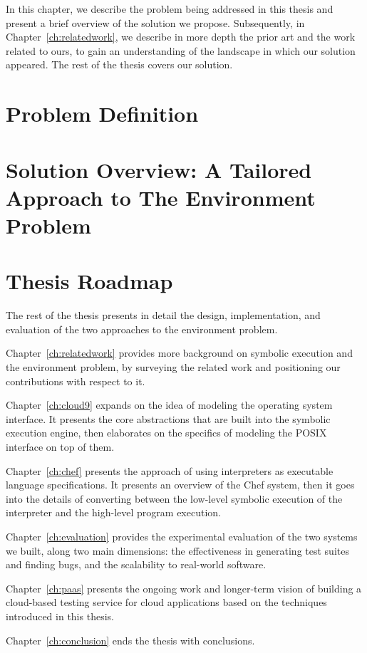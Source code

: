 In this chapter, we describe the problem being addressed in this thesis and present a brief overview of the solution we propose.
%
Subsequently, in Chapter~\ref{ch:relatedwork}, we describe in more depth the prior art and the work related to ours, to gain an understanding of the landscape in which our solution appeared.
%
The rest of the thesis covers our solution.

\section{Problem Definition}


\section{Solution Overview: A Tailored Approach to The Environment Problem}



\section{Thesis Roadmap}

The rest of the thesis presents in detail the design, implementation, and evaluation of the two approaches to the environment problem.

Chapter~\ref{ch:relatedwork} provides more background on symbolic execution and the environment problem, by surveying the related work and positioning our contributions with respect to it.

Chapter~\ref{ch:cloud9} expands on the idea of modeling the operating system interface.  It presents the core abstractions that are built into the symbolic execution engine, then elaborates on the specifics of modeling the POSIX interface on top of them.

Chapter~\ref{ch:chef} presents the approach of using interpreters as executable language specifications.  It presents an overview of the Chef system, then it goes into the details of converting between the low-level symbolic execution of the interpreter and the high-level program execution.

Chapter~\ref{ch:evaluation} provides the experimental evaluation of the two systems we built, along two main dimensions: the effectiveness in generating test suites and finding bugs, and the scalability to real-world software.

Chapter~\ref{ch:paas} presents the ongoing work and longer-term vision of building a cloud-based testing service for cloud applications based on the techniques introduced in this thesis.

Chapter~\ref{ch:conclusion} ends the thesis with conclusions.

